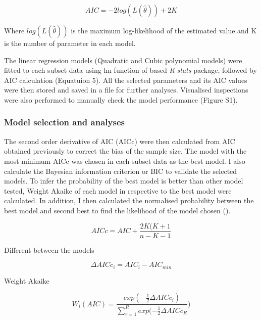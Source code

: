 \documentclass[12pt]{article}
\begin{document}
\begin{linenumbers}
    \begin{equation}
        AIC = -2log(L(\hat \theta)) + 2K
    \end{equation}
    
\noindent Where \(log(L(\hat \theta))\) is the maximum log-likelihood of the estimated value and K is the number of parameter in each model.

\vspace{0.5cm}

\noindent The linear regression models (Quadratic and Cubic polynomial models) were fitted to each subset data using lm function of based \textit{R stats} package, followed by AIC calculation (Equatuion 5). All the selected parameters and its AIC values were then stored and saved in a file for further analyses. Visualised inspections were also performed to manually check the model performance (Figure S1).


\subsubsection{Model selection and analyses}

\noindent The second order derivative of AIC (AICc) were then calculated from AIC obtained previously to correct the bias of the sample size. The model with the most minimum AICc was chosen in each subset data as the best model. I also calculate the Bayesian information criterion or BIC to validate the selected models. To infer the probability of the best model is better than other model tested, Weight Akaike of each model in respective to the best model were calculated. In addition, I then calculated the normalised probability between the best model and second best to find the likelihood of the model chosen (\cite{burnham_model_2002}).

\begin{equation}
    AICc = AIC + \frac{2K(K + 1}{n - K - 1}
\end{equation}

\noindent Different between the models

\begin{equation}
    \Delta AICc_{i} = AIC_{i} - AIC_{min}
\end{equation}

\noindent Weight Akaike

\begin{equation}
    W_{i}(AIC) = \frac{exp(-\frac{1}{2}\Delta AICc_{i})}{\sum_{r=1}^R exp(-\frac{1}{2}\Delta AICc_{R}})
\end{equation}


\end{linenumbers}
\end{document}
